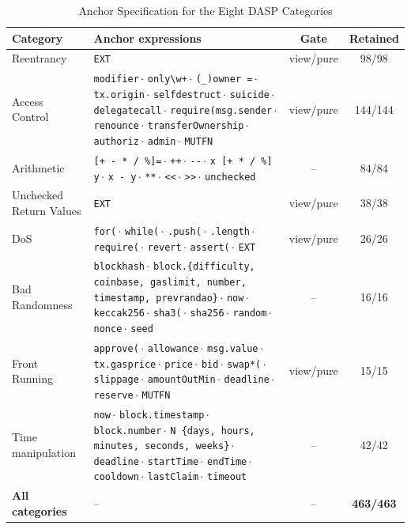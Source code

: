 \documentclass{ieeeaccess}
\newcommand{\sep}{\,$\cdot$ }
\begin{document}
\begin{table}[htbp]
\centering
\caption{Anchor Specification for the Eight DASP Categories}
\label{tab:anchors}
\footnotesize
\renewcommand{\arraystretch}{1.2}
\begin{tabular}{@{}p{3.2cm} p{11.0cm} c c@{}}
\hline
\textbf{Category} & \textbf{Anchor expressions} & \textbf{Gate} & \textbf{Retained} \\
\hline
Reentrancy & \texttt{EXT} & view/pure & 98/98 \\
Access Control & \texttt{modifier}\sep\texttt{only\textbackslash w+}\sep\texttt{(\_)owner =}\sep\texttt{tx.origin}\sep\texttt{selfdestruct}\sep\texttt{suicide}\sep\texttt{delegatecall}\sep\texttt{require(msg.sender}\sep\texttt{renounce}\sep\texttt{transferOwnership}\sep\texttt{authoriz}\sep\texttt{admin}\sep\texttt{MUTFN} & view/pure & 144/144 \\
Arithmetic & \texttt{[+ - * / \%]=}\sep\texttt{++}\sep\texttt{-{}-}\sep\texttt{x [+ * / \%] y}\sep\texttt{x - y}\sep\texttt{**}\sep\texttt{<{}<}\sep\texttt{>{}>}\sep\texttt{unchecked} & -- & 84/84 \\
Unchecked Return Values & \texttt{EXT} & view/pure & 38/38 \\
DoS & \texttt{for(}\sep\texttt{while(}\sep\texttt{.push(}\sep\texttt{.length}\sep\texttt{require(}\sep\texttt{revert}\sep\texttt{assert(}\sep\texttt{EXT} & view/pure & 26/26 \\
Bad Randomness & \texttt{blockhash}\sep\texttt{block.\{difficulty, coinbase, gaslimit, number, timestamp, prevrandao\}}\sep\texttt{now}\sep\texttt{keccak256}\sep\texttt{sha3(}\sep\texttt{sha256}\sep\texttt{random}\sep\texttt{nonce}\sep\texttt{seed} & -- & 16/16 \\
Front Running & \texttt{approve(}\sep\texttt{allowance}\sep\texttt{msg.value}\sep\texttt{tx.gasprice}\sep\texttt{price}\sep\texttt{bid}\sep\texttt{swap*(}\sep\texttt{slippage}\sep\texttt{amountOutMin}\sep\texttt{deadline}\sep\texttt{reserve}\sep\texttt{MUTFN} & view/pure & 15/15 \\
Time manipulation & \texttt{now}\sep\texttt{block.timestamp}\sep\texttt{block.number}\sep\texttt{N \{days, hours, minutes, seconds, weeks\}}\sep\texttt{deadline}\sep\texttt{startTime}\sep\texttt{endTime}\sep\texttt{cooldown}\sep\texttt{lastClaim}\sep\texttt{timeout} & -- & 42/42 \\
\hline
\textbf{All categories} & -- & -- & \textbf{463/463} \\
\hline
\end{tabular}
\vspace{2pt}

\end{table}
\end{document}
